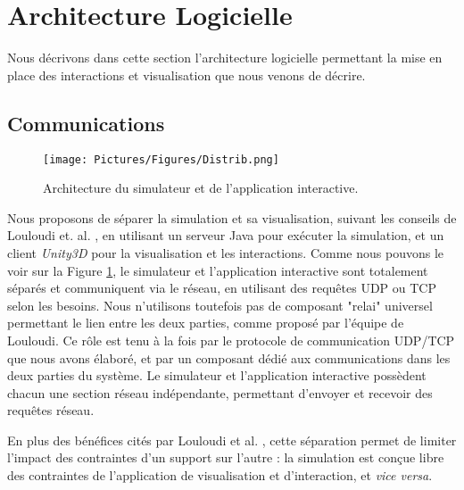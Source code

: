 	\section{Architecture Logicielle}
	
	Nous décrivons dans cette section l'architecture logicielle permettant la mise en place des interactions et visualisation que nous venons de décrire.
	
	\subsection{Communications}

	\begin{figure}
	\centering
	\texttt{[image: Pictures/Figures/Distrib.png]}
	\caption{Architecture du simulateur et de l'application interactive.}
	\label{archi}
	\end{figure}
	
	
	Nous proposons de séparer la simulation et sa visualisation, suivant les conseils de Louloudi et. al. \cite{louloudi_new_2012}, en utilisant un serveur Java pour exécuter la simulation, et un client \textit{Unity3D} pour la visualisation et les interactions. Comme nous pouvons le voir sur la Figure \ref{archi}, le simulateur et l'application interactive sont totalement séparés et communiquent via le réseau, en utilisant des requêtes UDP ou TCP selon les besoins. Nous n'utilisons toutefois pas de composant "relai" universel permettant le lien entre les deux parties, comme proposé par l'équipe de Louloudi. Ce rôle est tenu à la fois par le protocole de communication UDP/TCP que nous avons élaboré, et par un composant dédié aux communications dans les deux parties du système. Le simulateur et l'application interactive possèdent chacun une section réseau indépendante, permettant d'envoyer et recevoir des requêtes réseau.
	
	En plus des bénéfices cités par Louloudi et al. \cite{louloudi_new_2012}, cette séparation permet de limiter l'impact des contraintes d'un support sur l'autre : la simulation est conçue libre des contraintes de l'application de visualisation et d'interaction, et \textit{vice versa}. 	
	
